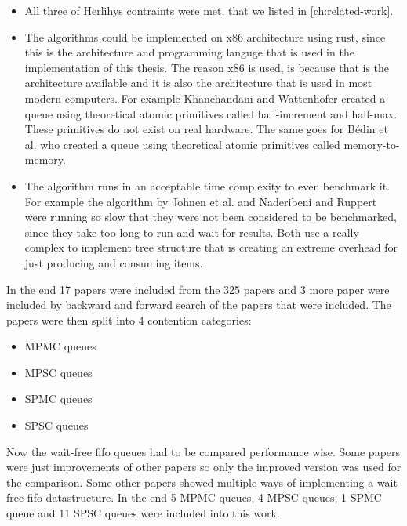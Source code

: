 \begin{itemize}
   \item All three of Herlihys contraints were met, that we listed in \cref{ch:related-work}.
   \item The algorithms could be implemented on x86 architecture using rust, since this is the architecture and programming languge that is used in the implementation of this thesis. The reason x86 is used, is because that is the architecture available and it is also the architecture that is used in most modern computers. For example Khanchandani and Wattenhofer \cite{halfincrementhalfmax} created a queue using theoretical atomic primitives called half-increment and half-max. These primitives do not exist on real hardware. The same goes for Bédin et al. \cite{memorytomemory} who created a queue using theoretical atomic primitives called memory-to-memory.
   \item The algorithm runs in an acceptable time complexity to even benchmark it. For example the algorithm by Johnen et al. \cite{johnen_et_al:LIPIcs.OPODIS.2022.4} and Naderibeni and Ruppert \cite{polylog} were running so slow that they were not been considered to be benchmarked, since they take too long to run and wait for results. Both use a really complex to implement tree structure that is creating an extreme overhead for just producing and consuming items. 
\end{itemize}
In the end 17 papers were included from the 325 papers and 3 more paper were included by backward and forward search of the papers that were included. The papers were then split into 4 contention categories:
\begin{itemize}
   \item \ac{MPMC} queues \cite{Kogan2011WaitFreeQueues,FeldmanDechevV2,RamalheteQueue,Verma2013Scalable,FastFetchAndAddWaitFreeQueue}
   \item \ac{MPSC} queues \cite{WangCacheCoherent,jiffy,JayantiLog,Drescher2015GuardedSections}
   \item \ac{SPMC} queues \cite{Mateíspmc}
   \item \ac{SPSC} queues \cite{Lamport1983SPSCCircularBuffer,torquati2010singleproducersingleconsumerqueuessharedcache,Wang2013BQueue,MaffioneCacheAware,ffq}
\end{itemize}
Now the wait-free fifo queues had to be compared performance wise. Some papers were just improvements of other papers so only the improved version was used for the comparison. Some other papers showed multiple ways of implementing a wait-free fifo datastructure. In the end 5 \ac{MPMC} queues, 4 \ac{MPSC} queues, 1 \ac{SPMC} queue and 11 \ac{SPSC} queues were included into this work.